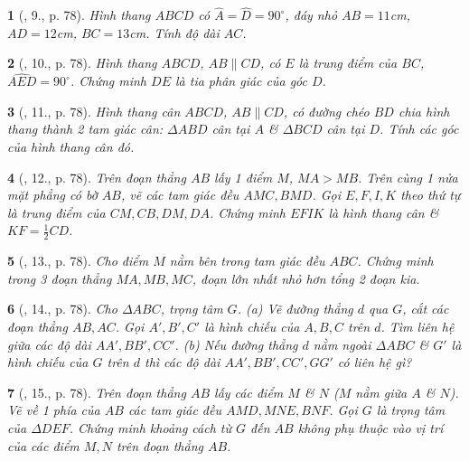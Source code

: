 \documentclass{article}
\newtheorem{baitoan}{}
\begin{document}
\begin{baitoan}[\cite{Binh_Toan_8_tap_1}, 9., p. 78]
	Hình thang $ABCD$ có $\widehat{A} = \widehat{D} = 90^\circ$, đáy nhỏ $AB = 11${\rm cm}, $AD = 12${\rm cm}, $BC = 13${\rm cm}. Tính độ dài $AC$.
\end{baitoan}

\begin{baitoan}[\cite{Binh_Toan_8_tap_1}, 10., p. 78]
	Hình thang $ABCD$, $AB\parallel CD$, có $E$ là trung điểm của $BC$, $\widehat{AED} = 90^\circ$. Chứng minh $DE$ là tia phân giác của góc $D$.
\end{baitoan}

\begin{baitoan}[\cite{Binh_Toan_8_tap_1}, 11., p. 78]
	Hình thang cân $ABCD$, $AB\parallel CD$, có đường chéo $BD$ chia hình thang thành 2 tam giác cân: $\Delta ABD$ cân tại $A$ \& $\Delta BCD$ cân tại $D$. Tính các góc của hình thang cân đó.
\end{baitoan}

\begin{baitoan}[\cite{Binh_Toan_8_tap_1}, 12., p. 78]
	Trên đoạn thẳng $AB$ lấy 1 điểm $M$, $MA > MB$. Trên cùng 1 nửa mặt phẳng có bờ $AB$, vẽ các tam giác đều $AMC,BMD$. Gọi $E,F,I,K$ theo thứ tự là trung điểm của $CM,CB,DM,DA$. Chứng minh $EFIK$ là hình thang cân \& $KF = \frac{1}{2}CD$.
\end{baitoan}

\begin{baitoan}[\cite{Binh_Toan_8_tap_1}, 13., p. 78]
	Cho điểm $M$ nằm bên trong tam giác đều $ABC$. Chứng minh trong 3 đoạn thẳng $MA,MB,MC$, đoạn lớn nhất nhỏ hơn tổng 2 đoạn kia.
\end{baitoan}

\begin{baitoan}[\cite{Binh_Toan_8_tap_1}, 14., p. 78]
	Cho $\Delta ABC$, trọng tâm $G$. (a) Vẽ đường thẳng $d$ qua $G$, cắt các đoạn thẳng $AB,AC$. Gọi $A',B',C'$ là hình chiếu của $A,B,C$ trên $d$. Tìm liên hệ giữa các độ dài $AA',BB',CC'$. (b) Nếu đường thẳng $d$ nằm ngoài $\Delta ABC$ \& $G'$ là hình chiếu của $G$ trên $d$ thì các độ dài $AA',BB',CC',GG'$ có liên hệ gì?
\end{baitoan}

\begin{baitoan}[\cite{Binh_Toan_8_tap_1}, 15., p. 78]
	Trên đoạn thẳng $AB$ lấy các điểm $M$ \& $N$ ($M$ nằm giữa $A$ \& $N$). Vẽ về 1 phía của $AB$ các tam giác đều $AMD,MNE,BNF$. Gọi $G$ là trọng tâm của $\Delta DEF$. Chứng minh khoảng cách từ $G$ đến $AB$ không phụ thuộc vào vị trí của các điểm $M,N$ trên đoạn thẳng $AB$.
\end{baitoan}
\end{document}

